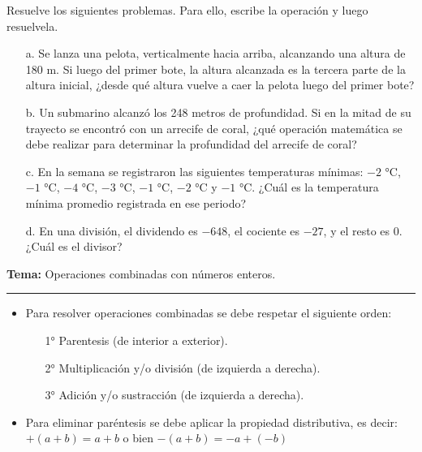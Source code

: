 \documentclass[spanish,letterpaper, 11pt, addpoints, answers]{exam}
\begin{document}
\begin{questions}
  \question Resuelve los siguientes problemas. Para ello, escribe la operación y luego resuelvela.
  
    \begin{itemize}
      \item[a.] Se lanza una pelota, verticalmente hacia arriba, alcanzando una altura de 180 m. Si luego del primer bote, la altura alcanzada es la tercera parte de la altura inicial, ¿desde qué altura vuelve a caer la pelota luego del primer bote?
      \vspace{2cm}
      \item[b.] Un submarino alcanzó los 248 metros de profundidad. Si en la mitad de su trayecto se encontró con un arrecife de coral, ¿qué operación matemática se debe realizar para determinar la profundidad del arrecife de coral?
      \vspace{2cm}
      \item[c.] En la semana se registraron las siguientes temperaturas mínimas: $-2$ °C, $-1$ °C, $-4$ °C, $-3$ °C, $-1$ °C, $-2$ °C y $-1$ °C. ¿Cuál es la temperatura mínima promedio registrada en ese periodo?
      \vspace{2cm}
      \item[d.] En una división, el dividendo es $-648$, el cociente es $-27$, y el resto es $0$. ¿Cuál es el divisor?

    \end{itemize}
    
    \newpage
    \vspace{0.1in}
    \parbox{6in}{
    \textbf{Tema:} Operaciones combinadas con números enteros.}
    \vspace{0.15in}
    \hrule 
    
    \begin{itemize}
      \item Para resolver operaciones combinadas se debe respetar el siguiente orden:
      \begin{itemize}
        \item[1°] Parentesis (de interior a exterior).
        \item[2°] Multiplicación y/o división (de izquierda a derecha).
        \item[3°] Adición y/o sustracción (de izquierda a derecha).
      \end{itemize}
    
      \item Para eliminar paréntesis se debe aplicar la propiedad distributiva, es decir:
      $+(a+b)=a+b$ o bien $-(a+b)=-a+(-b)$
      

\end{itemize}
\end{questions}
\end{document}
